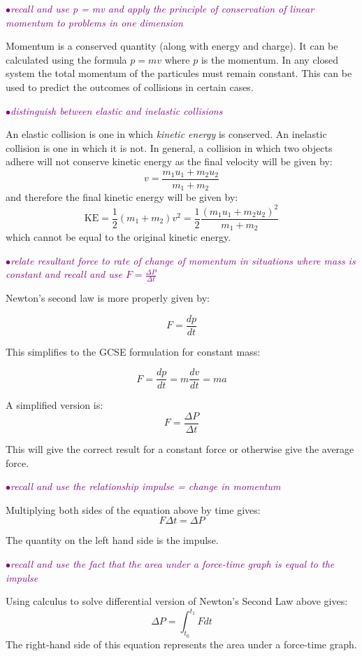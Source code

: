\documentclass[a4paper,11pt,twoside]{memoir}
\newcounter{spec}[chapter]
\newcommand{\spec}[1]{\Needspace{5\baselineskip}\textcolor{purple}{$\bullet$\hspace{0.5cm}\textit{#1}}}
\begin{document}
\spec{recall and use p = mv and apply the principle of conservation of linear momentum to problems in one dimension}

Momentum is a conserved quantity (along with energy and charge). It can be calculated using the formula $p=mv$ where $p$ is the momentum. In any closed system the total momentum of the particules must remain constant. This can be used to predict the outcomes of collisions in certain cases.

\spec{distinguish between elastic and inelastic collisions}

An elastic collision is one in which \emph{kinetic energy} is conserved. An inelastic collision is one in which it is not. In general, a collision in which two objects adhere will not conserve kinetic energy as the final velocity will be given by:
$$ v = \frac{m_1u_1+m_2u_2}{m_1+m_2} $$
and therefore the final kinetic energy will be given by:
\[ \text{KE} = \frac{1}{2}(m_1+m_2)v^2 = \frac{1}{2}\frac{\left( m_1u_1+m_2u_2\right)^2}{m_1+m_2}\]
which cannot be equal to the original kinetic energy.

\spec{relate resultant force to rate of change of momentum in situations where mass is constant and recall and use $F = \frac{\Delta P}{\Delta t}$}

Newton's second law is more properly given by:

\[ F = \frac{dp}{dt} \]

This simplifies to the GCSE formulation for constant mass:

\[ F = \frac{dp}{dt} = m\frac{dv}{dt} = ma \]

A simplified version is:
$$F = \frac{\Delta P}{\Delta t}$$

This will give the correct result for a constant force or otherwise give the average force.

\spec{recall and use the relationship impulse = change in momentum}

Multiplying both sides of the equation above by time gives:
$$ F \Delta t = \Delta P $$

The quantity on the left hand side is the impulse.

\spec{recall and use the fact that the area under a force-time graph is equal to the impulse}

Using calculus to solve differential version of Newton's Second Law above gives:
$$ \Delta P = \int_{t_0}^{t_1} F dt $$
The right-hand side of this equation represents the area under a force-time graph.
\end{document}

